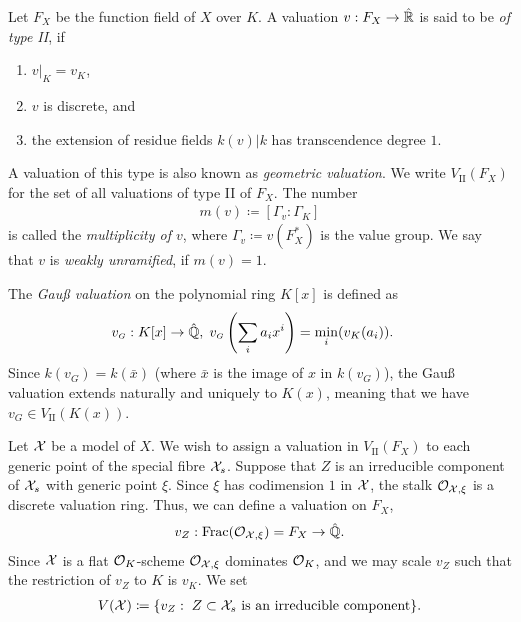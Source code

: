 \begin{definition}
    Let $F_X$ be the function field of $X$ over $K$.
    A valuation $v: F_X \to \hat{\mathbb R}$ is said to be \textit{of type \textrm{II}}, if
    \begin{enumerate}
        \item $v|_K = v_K$,
        \item $v$ is discrete, and
        \item the extension of residue fields $k(v)|k$ has transcendence degree $1$.
    \end{enumerate}
    A valuation of this type is also known as \textit{geometric valuation}.
    We write $V_\textrm{II}(F_X)$ for the set of all valuations of type \textrm{II} of $F_X$.
    The number
    \begin{align}
        m(v) \coloneqq [\Gamma_v : \Gamma_K]
    \end{align}
    is called the \textit{multiplicity of $v$}, where $\Gamma_v \coloneqq v(F_X^*)$ is the value group.
    We say that $v$ is \textit{weakly unramified}, if $m(v) = 1$.
\end{definition}

\begin{example}
    The \textit{Gauß valuation} on the polynomial ring $K[x]$ is defined as
    \begin{align}
        v_{\scriptscriptstyle G}: K[x] &\to \hat{\mathbb Q}, \; v_{\scriptscriptstyle G}\left( \sum_i a_i x^{i} \right) = \min_i(v_K(a_i)).
    \end{align}
    Since $k(v_{\scriptscriptstyle G}) = k(\bar{x})$ (where $\bar{x}$ is the image of $x$ in $k(v_{\scriptscriptstyle G})$), the Gauß valuation
    extends naturally and uniquely to $K(x)$, meaning that we have $v_{\scriptscriptstyle G} \in V_\textrm{II}(K(x))$.
\end{example}

Let $\mathcal X$ be a model of $X$.
We wish to assign a valuation in $V_\textrm{II}(F_X)$ to each generic point of the special fibre $\mathcal X_s$.
Suppose that $Z$ is an irreducible component of $\mathcal X_s$ with generic point $\xi$.
Since $\xi$ has codimension $1$ in $\mathcal X$, the stalk $\mathcal{O}_{\mathcal X,\xi}$ is a discrete valuation ring\@.
Thus, we can define a valuation on $F_X$,
\begin{align} \label{eq:ValuationOfComponent}
    v_Z: \mathrm{Frac}(\mathcal{O}_{\mathcal X, \xi}) = F_X \to \hat{\mathbb Q}.
\end{align}
Since $\mathcal X$ is a flat $\mathcal O_K $-scheme $\mathcal{O}_{\mathcal X, \xi}$ dominates $\mathcal O_K$, and we may scale $v_Z$ such that the restriction of $v_Z$ to $K$ is $v_K$.
We set
\begin{align}
    V(\mathcal X) \coloneqq \lbrace v_Z: \; Z \subset \mathcal X_s \text{ is an irreducible component}\rbrace.
\end{align}


